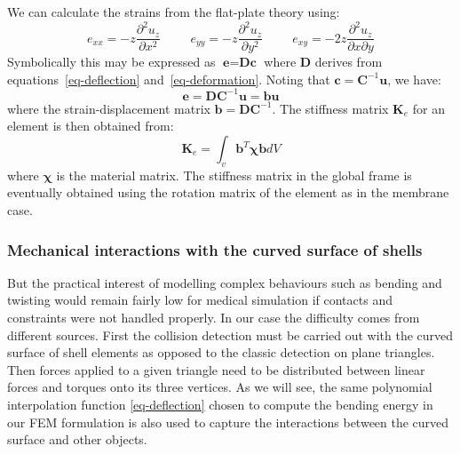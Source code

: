 \documentclass{llncs}
\begin{document}
We can calculate the strains from the flat-plate theory using:
\begin{equation}
\label{eq-deformation}
e_{xx} = -z \frac{\partial^2u_z}{\partial x^2}
\hspace{1cm}
e_{yy} = -z \frac{\partial^2u_z}{\partial y^2}
\hspace{1cm}
e_{xy} = -2z \frac{\partial^2u_z}{\partial x \partial y}
\end{equation} 
Symbolically this may be expressed as $\textbf{e} = \textbf{Dc}$ where $\textbf{D}$ derives from equations~\ref{eq-deflection} and~\ref{eq-deformation}. Noting that $\textbf{c} = \textbf{C}^{-1}\textbf{u}$, we have:
\begin{equation}
\textbf{e} = \textbf{DC}^{-1}\textbf{u} = \textbf{bu}
\end{equation} 
where the strain-displacement matrix $\textbf{b} = \textbf{DC}^{-1}$. 
The stiffness matrix $\textbf{K}_e$ for an element is then obtained from:
\begin{equation}
\textbf{K}_e = \int_v \textbf{b}^{T} \boldsymbol\chi \textbf{b} dV
\end{equation} 
where $\boldsymbol\chi$ is the material matrix. The stiffness matrix in the global frame is eventually obtained using the rotation matrix of the element as in the membrane case. 

\subsubsection{Mechanical interactions with the curved surface of shells}
\label{sec:interactions}
But the practical interest of modelling complex behaviours such as bending and twisting would remain fairly low for medical simulation if contacts and constraints were not handled properly. In our case the difficulty comes from different sources. First the collision detection must be carried out with the curved surface of shell elements as opposed to the classic detection on plane triangles. Then forces applied to a given triangle need to be distributed between linear forces and torques onto its three vertices.  As we will see, the same polynomial interpolation function \ref{eq-deflection} chosen to compute the bending energy in our FEM formulation is also used to capture the interactions between the curved surface and other objects. 
\end{document}
